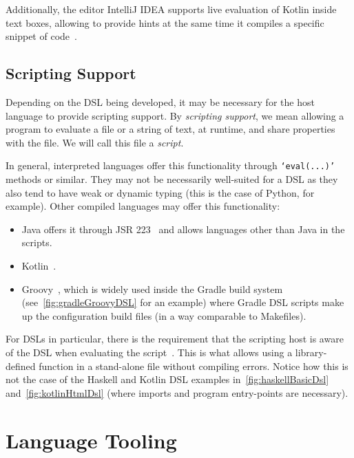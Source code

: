Additionally, the editor IntelliJ IDEA supports live evaluation of Kotlin inside text boxes, allowing to provide hints at the same time it compiles a specific snippet of code~\cite{intelliJRepo}.

\subsection{Scripting Support}\label{subsec:scripting-support}

Depending on the DSL being developed, it may be necessary for the host language to provide scripting support.
By \emph{scripting support}, we mean allowing a program to evaluate a file or a string of text, at runtime, and share properties with the file.
We will call this file a \emph{script}.

In general, interpreted languages offer this functionality through \texttt{`eval(...)'} methods or similar.
They may not be necessarily well-suited for a DSL as they also tend to have weak or dynamic typing (this is the case of Python, for example).
Other compiled languages may offer this functionality:
\begin{itemize}
    \item Java offers it through JSR 223~\cite{javaScripting} and allows languages other than Java in the scripts.
    \item Kotlin~\cite{kotlinScriptKeep}.
    \item Groovy~\cite{groovyScripting}, which is widely used inside the Gradle build system (see~\autoref{fig:gradleGroovyDSL} for an example) where Gradle DSL scripts make up the configuration build files (in a way comparable to Makefiles).
\end{itemize}

For DSLs in particular, there is the requirement that the scripting host is aware of the DSL when evaluating the script~\cite{kotlinScriptKeep}.
This is what allows using a library-defined function in a stand-alone file without compiling errors.
Notice how this is not the case of the Haskell and Kotlin DSL examples in~\autoref{fig:haskellBasicDsl} and~\autoref{fig:kotlinHtmlDsl} (where imports and program entry-points are necessary).


\section{Language Tooling}\label{sec:language-tooling}

